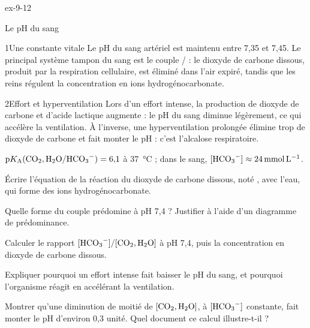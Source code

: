 \begin{blocLivre}{ex-9-12}
\begin{exercice}[3]{Le pH du sang}
\begin{docu}{1}{Une constante vitale}
Le pH du sang artériel est maintenu entre 7,35 et 7,45. Le principal système tampon du sang est le couple
/ : le dioxyde de carbone dissous, produit par la respiration cellulaire, est éliminé dans l'air
expiré, tandis que les reins régulent la concentration en ions hydrogénocarbonate.
\end{docu}
\begin{docu}{2}{Effort et hyperventilation}
Lors d'un effort intense, la production de dioxyde de carbone et d'acide lactique augmente : le pH du sang diminue
légèrement, ce qui accélère la ventilation. À l'inverse, une hyperventilation prolongée élimine trop de dioxyde de
carbone et fait monter le pH : c'est l'alcalose respiratoire.
\end{docu}
\begin{donnees}
$\pKa(\ce{CO2,H2O}/\ce{HCO3-})=6{,}1$ à 37~°C ; dans le sang, $[\ce{HCO3-}]\approx\qty{24}{mmol.L^{-1}}$.
\end{donnees}
\begin{questions}
\item Écrire l'équation de la réaction du dioxyde de carbone dissous, noté , avec l'eau, qui forme des ions
hydrogénocarbonate.
\item Quelle forme du couple prédomine à pH 7,4 ? Justifier à l'aide d'un diagramme de prédominance.
\item {}Calculer le rapport $[\ce{HCO3-}]/[\ce{CO2,H2O}]$ à pH 7,4, puis la concentration
en dioxyde de carbone dissous.
\item Expliquer pourquoi un effort intense fait baisser le pH du sang, et pourquoi l'organisme réagit en accélérant la
ventilation.
\item \initiative Montrer qu'une diminution de moitié de $[\ce{CO2,H2O}]$, à $[\ce{HCO3-}]$ constante, fait monter le
pH d'environ 0,3 unité. Quel document ce calcul illustre-t-il ?
\end{questions}
\end{exercice}
\end{blocLivre}
